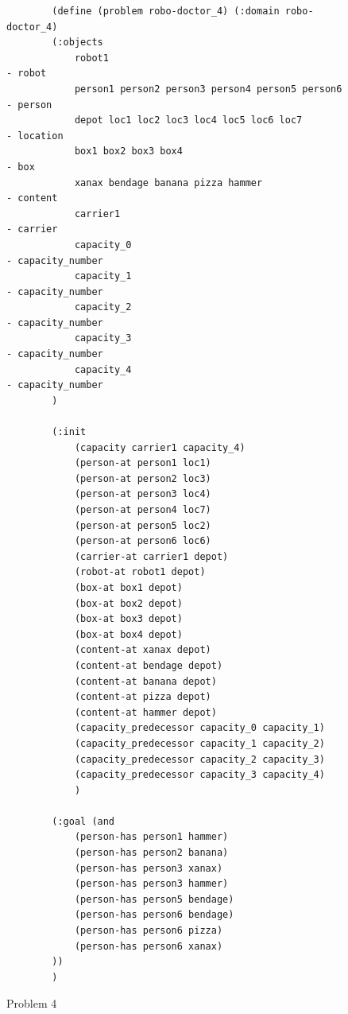 \begin{figure}[h!]
    \begin{verbatim}
        (define (problem robo-doctor_4) (:domain robo-doctor_4)
        (:objects 
            robot1                                              - robot
            person1 person2 person3 person4 person5 person6     - person
            depot loc1 loc2 loc3 loc4 loc5 loc6 loc7            - location
            box1 box2 box3 box4                                 - box
            xanax bendage banana pizza hammer                   - content
            carrier1                                            - carrier
            capacity_0                                          - capacity_number
            capacity_1                                          - capacity_number
            capacity_2                                          - capacity_number
            capacity_3                                          - capacity_number
            capacity_4                                          - capacity_number
        )

        (:init
            (capacity carrier1 capacity_4)
            (person-at person1 loc1)
            (person-at person2 loc3)
            (person-at person3 loc4)
            (person-at person4 loc7)
            (person-at person5 loc2)
            (person-at person6 loc6)
            (carrier-at carrier1 depot)
            (robot-at robot1 depot)
            (box-at box1 depot)
            (box-at box2 depot)
            (box-at box3 depot)
            (box-at box4 depot)
            (content-at xanax depot)
            (content-at bendage depot)
            (content-at banana depot)
            (content-at pizza depot)
            (content-at hammer depot)
            (capacity_predecessor capacity_0 capacity_1)
            (capacity_predecessor capacity_1 capacity_2)
            (capacity_predecessor capacity_2 capacity_3)
            (capacity_predecessor capacity_3 capacity_4)
            )

        (:goal (and
            (person-has person1 hammer)
            (person-has person2 banana)
            (person-has person3 xanax)
            (person-has person3 hammer)
            (person-has person5 bendage)
            (person-has person6 bendage)
            (person-has person6 pizza)
            (person-has person6 xanax)
        ))
        )
    \end{verbatim}
    \caption{Problem 4}
    \label{problem4_problem}
\end{figure}


